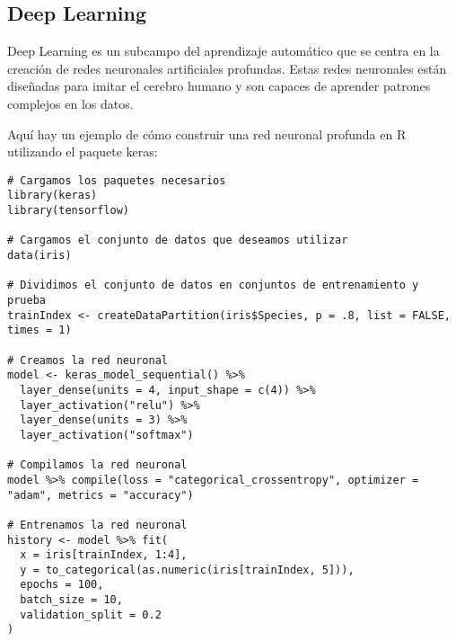 \documentclass{article}
\begin{document}
\subsection{Deep Learning}

Deep Learning es un subcampo del aprendizaje automático que se centra en la creación de redes neuronales artificiales profundas. Estas redes neuronales están diseñadas para imitar el cerebro humano y son capaces de aprender patrones complejos en los datos.

Aquí hay un ejemplo de cómo construir una red neuronal profunda en R utilizando el paquete keras:

\begin{verbatim}
# Cargamos los paquetes necesarios
library(keras)
library(tensorflow)

# Cargamos el conjunto de datos que deseamos utilizar
data(iris)

# Dividimos el conjunto de datos en conjuntos de entrenamiento y prueba
trainIndex <- createDataPartition(iris$Species, p = .8, list = FALSE, times = 1)

# Creamos la red neuronal
model <- keras_model_sequential() %>% 
  layer_dense(units = 4, input_shape = c(4)) %>% 
  layer_activation("relu") %>% 
  layer_dense(units = 3) %>% 
  layer_activation("softmax")

# Compilamos la red neuronal
model %>% compile(loss = "categorical_crossentropy", optimizer = "adam", metrics = "accuracy")

# Entrenamos la red neuronal
history <- model %>% fit(
  x = iris[trainIndex, 1:4],
  y = to_categorical(as.numeric(iris[trainIndex, 5])),
  epochs = 100,
  batch_size = 10,
  validation_split = 0.2
)
\end{verbatim}
\end{document}
